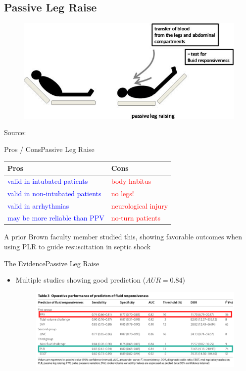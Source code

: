 \documentclass{beamer}
\newcommand{\pro}{\textcolor{blue}}
\newcommand{\con}{\textcolor{red}}
\begin{document}
		\subsection{Passive Leg Raise}
			\begin{frame}
				\begin{figure}
					\centering
					\includegraphics[width=0.95\linewidth]{figures/plr}
					\label{fig:plr}
				\end{figure}
				\tiny Source: \cite{Marik2011}
			\end{frame}
			\begin{frame}{Pros / Cons}{Passive Leg Raise}
				\begin{center}
					\begin{tabular}{l||l}
						\textbf{Pros} & \textbf{Cons} \\	
						\hline
						\pro{valid in intubated patients} & \con{body habitus}\\
						\hline
						\pro{valid in non-intubated patients} & \con{no legs!}\\
						\hline
						\pro{valid in arrhythmias} & \con{neurological injury}\\
						\hline
						\pro{may be more reliable than PPV} \cite{Monnet2012} & \con{no-turn patients}\\
					\end{tabular}
				\end{center} 
				 A prior Brown faculty member studied this, showing favorable outcomes when using PLR to guide resuscitation in septic shock \cite{Douglas2020}
			\end{frame}
			\begin{frame}{The Evidence}{Passive Leg Raise}
				\begin{itemize}
					\item Multiple studies showing good prediction ($AUR=0.84$) \cite{Monnet2006,AlvaradoSanchez2021}
					\begin{figure}
						\centering
						\includegraphics[width=0.9\linewidth]{figures/responsivenessMethodsCompared-2}
						\label{fig:responsivenessmethodscompared-2}
					\end{figure}
				\end{itemize}
			\end{frame}
\end{document}
